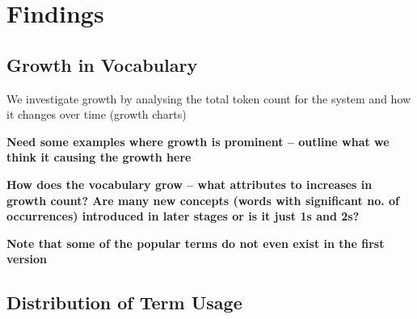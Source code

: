 \chapter{Findings}
\label{chapter:Findings}

\section{Growth in Vocabulary} %
\label{sec:growth_in_vocabulary}

We investigate growth by analysing the total token count for the system and how it changes over time (growth charts)

\textbf{Need some examples where growth is prominent -- outline what we think it causing the growth here}

\textbf{How does the vocabulary grow -- what attributes to increases in growth count? Are many new concepts (words with significant no. of occurrences) introduced in later stages or is it just 1s and 2s?}

\textbf{Note that some of the popular terms do not even exist in the first version}


% 
% 

% 
% 

\section{Distribution of Term Usage} %
\label{sec:distribution_of_term_usage}

